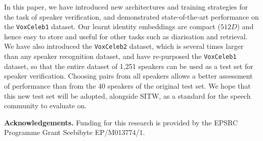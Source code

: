 \documentclass[a4paper]{article}
\def\newpara{\vspace{2pt}}
\begin{document}
In this paper, we have introduced new architectures and training strategies for the task of speaker verification, and demonstrated state-of-the-art performance on the \texttt{VoxCeleb1} dataset. 
Our learnt identity embeddings are compact ($512D$) and hence easy to store and useful for other tasks such as diarisation and retrieval.
We have also introduced the \texttt{VoxCeleb2} dataset, which is several times larger than any speaker recognition dataset, and
have re-purposed the \texttt{VoxCeleb1}  dataset, so that the entire dataset 
of 1,251 speakers can be used as
a test set for speaker verification. Choosing pairs from all speakers allows a 
better assessment of performance than from the $40$ speakers of the original test set. We hope that this
new test set will be adopted, alongside SITW, as a standard for the speech community to
evaluate on.


 \newpara\noindent\textbf{Acknowledgements.}
 Funding for this research is provided by the EPSRC 
 Programme Grant Seebibyte EP/M013774/1. 





\end{document}
